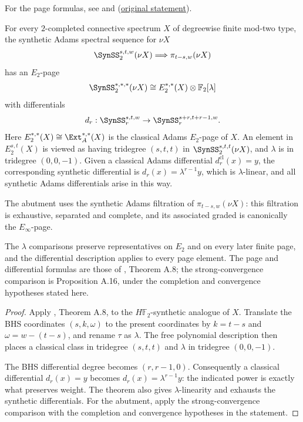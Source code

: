 \begin{theorem}
\label{paper:3.6}
For the page formulas, see \cite[Theorem A.8]{BHS} and
\cite[Theorem 3.6]{LWX126}
(\href{paper/main.tex.html#L799}{original statement}).\par
\label{thm:rigid}
    For every $2$-completed connective spectrum $X$ of degreewise finite
    mod-two type, the synthetic Adams spectral sequence for $\nu X$
     $$\SynSS_2^{s,t,w}(\nu X)\Longrightarrow \pi_{t-s,w}(\nu X)$$
     has an $E_2$-page
    $$\SynSS_2^{*,*,*}(\nu X) \cong E_2^{*,*}(X)\otimes \mathbb{F}_2[\lambda]$$
    with differentials
    $$d_r: \SynSS_r^{s,t,w}\to \SynSS_r^{s+r,t+r-1,w}.$$
    Here $E_2^{*,*}(X) \cong \Ext_A^{*,*}(X)$ is the classical Adams $E_2$-page of $X$. An element in $E_2^{s,t}(X)$ is viewed as having tridegree $(s, t, t)$ in $\SynSS_2^{s,t,t}(\nu X)$, and $\lambda$ is in tridegree $(0, 0, -1)$. Given a classical Adams differential $d_r^{\mathrm{cl}}(x)=y$, the corresponding synthetic differential is $d_r(x)=\lambda^{r-1}y$, which is $\lambda$-linear, and all synthetic Adams differentials arise in this way.


The abutment uses the synthetic Adams filtration of
$\pi_{t-s,w}(\nu X)$: this filtration is exhaustive, separated and
complete, and its associated graded is canonically the $E_\infty$-page.

The $\lambda$ comparisons preserve representatives on $E_2$ and on
every later finite page, and the differential description applies to
every page element. The page and differential formulas are those of
\cite{BHS}, Theorem A.8; the strong-convergence comparison is
Proposition A.16, under the completion and convergence hypotheses
stated here.

\end{theorem}
\begin{proof}
Apply \cite{BHS}, Theorem A.8, to the $H\mathbb F_2$-synthetic analogue of $X$. Translate the BHS coordinates $(s,k,\omega)$ to the present coordinates by $k=t-s$ and $\omega=w-(t-s)$, and rename $\tau$ as $\lambda$. The free polynomial description then places a classical class in tridegree $(s,t,t)$ and $\lambda$ in tridegree $(0,0,-1)$.

The BHS differential degree becomes $(r,r-1,0)$. Consequently a classical differential $d_r(x)=y$ becomes $d_r(x)=\lambda^{r-1}y$: the indicated power is exactly what preserves weight. The theorem also gives $\lambda$-linearity and exhausts the synthetic differentials. For the abutment, apply the strong-convergence comparison with the
completion and convergence hypotheses in the statement.
\end{proof}



